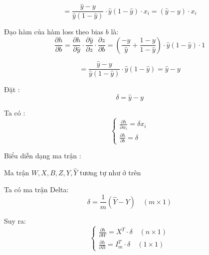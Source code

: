 \documentclass{article}
\begin{document}
\[
    = \frac{\hat{y} - y}{\hat{y}(1-\hat{y})} \cdot \hat{y}(1 - \hat{y}) \cdot x_i = 
    (\hat{y} - y) \cdot x_i
\]

\noindent Đạo hàm của hàm loss theo bias $b$ là:
\[
    \frac{\partial h}{\partial b} = 
    \frac{\partial h}{\partial \hat{y}} \cdot
    \frac{\partial \hat{y}}{\partial z} \cdot
    \frac{\partial z}{\partial b} =
    \left(\frac{-y}{\hat{y}} + \frac{1-y}{1-\hat{y}}\right) \cdot \hat{y}(1 - \hat{y}) \cdot 1
\]

\[
    = \frac{\hat{y} - y}{\hat{y}(1-\hat{y})} \cdot \hat{y}(1 - \hat{y}) = 
    \hat{y} - y
\]

\noindent Đặt :
\[\delta = \hat{y} - y\]

\noindent Ta có :
\[
    \begin{cases}
        \frac{\partial h}{\partial w_i} = \delta x_i \\
        \frac{\partial h}{\partial b} = \delta
    \end{cases}
\]

\noindent Biểu diễn dạng ma trận :

\vspace{0.3cm}
\noindent Ma trận $W, X, B, Z, Y, \hat{Y}$ tương tự như ở trên

\vspace{0.3cm}
\noindent Ta có ma trận Delta:
\[
    \delta = \frac{1}{m} (\hat{Y} - Y) \quad (m \times 1)
\]

\noindent Suy ra:
\[
    \begin{cases}
        \frac{\partial h}{\partial W} = X^T \cdot \delta \quad (n \times 1) \\
        \frac{\partial h}{\partial B} = I_m^T \cdot \delta \quad (1 \times 1)
    \end{cases}
\]
\end{document}
